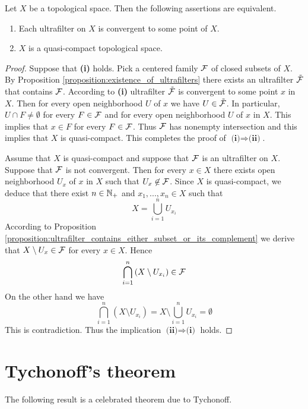 \begin{theorem}\label{theorem:quasi_compact_in_terms_of_ultrafilters}
	Let $X$ be a topological space. Then the following assertions are equivalent.
	\begin{enumerate}[label=\emph{\textbf{(\roman*)}}, leftmargin=*]
		\item Each ultrafilter on $X$ is convergent to some point of $X$.
		\item $X$ is a quasi-compact topological space.
	\end{enumerate}
\end{theorem}
\begin{proof}
	Suppose that \textbf{(i)} holds. Pick a centered family ${\mathcal F}$ of closed subsets of $X$. By Proposition \ref{proposition:existence_of_ultrafilters} there exists an ultrafilter $\tilde{{\mathcal F}}$ that contains ${\mathcal F}$. According to \textbf{(i)} ultrafilter $\tilde{{\mathcal F}}$ is convergent to some point $x$ in $X$. Then for every open neighborhood $U$ of $x$ we have $U \in \tilde{{\mathcal F}}$. In particular, $U\cap F \neq \emptyset$ for every $F\in {\mathcal F}$ and for every open neighborhood $U$ of $x$ in $X$. This implies that $x \in F$ for every $F\in {\mathcal F}$. Thus ${\mathcal F}$ has nonempty intersection and this implies that $X$ is quasi-compact. This completes the proof of $\textbf{(i)}\Rightarrow \textbf{(ii)}$.

	Assume that $X$ is quasi-compact and suppose that ${\mathcal F}$ is an ultrafilter on $X$. Suppose that ${\mathcal F}$ is not convergent. Then for every $x \in X$ there exists open neighborhood $U_x$ of $x$ in $X$ such that $U_x \not \in {\mathcal F}$. Since $X$ is quasi-compact, we deduce that there exist $n\in {\mathbb N}_+$ and $x_1,...,x_n \in X$ such that
	$$X = \bigcup_{i=1}^nU_{x_i}$$
	According to Proposition \ref{proposition:ultrafilter_contains_either_subset_or_its_complement} we derive that $X \setminus U_x \in {\mathcal F}$ for every $x \in X$. Hence
	$$\bigcap_{i=1}^n\left(X\setminus U_{x_i}\right) \in {\mathcal F}$$
	On the other hand we have
	$$\bigcap_{i=1}^n\left(X\setminus U_{x_i}\right) = X \setminus \bigcup_{i=1}^nU_{x_i} = \emptyset$$
	This is contradiction. Thus the implication $\textbf{(ii)}\Rightarrow \textbf{(i)}$ holds.
\end{proof}

\section{Tychonoff's theorem}
\noindent
The following result is a celebrated theorem due to Tychonoff.

